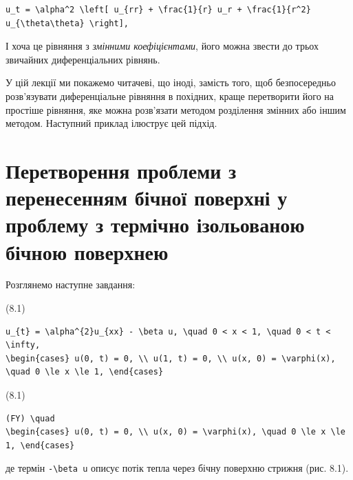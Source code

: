 \documentclass[
  ukrainian,
]{article}
\begin{document}
\begin{verbatim}
u_t = \alpha^2 \left[ u_{rr} + \frac{1}{r} u_r + \frac{1}{r^2} u_{\theta\theta} \right],
\end{verbatim}

І хоча це рівняння з \emph{змінними коефіцієнтами}, його можна звести до
трьох звичайних диференціальних рівнянь.

У цій лекції ми покажемо читачеві, що іноді, замість того, щоб
безпосередньо розв'язувати диференціальне рівняння в похідних, краще
перетворити його на простіше рівняння, яке можна розв'язати методом
розділення змінних або іншим методом. Наступний приклад ілюструє цей
підхід.

\section{Перетворення проблеми з перенесенням бічної поверхні у проблему
з термічно ізольованою бічною
поверхнею}\label{ux43fux435ux440ux435ux442ux432ux43eux440ux435ux43dux43dux44f-ux43fux440ux43eux431ux43bux435ux43cux438-ux437-ux43fux435ux440ux435ux43dux435ux441ux435ux43dux43dux44fux43c-ux431ux456ux447ux43dux43eux457-ux43fux43eux432ux435ux440ux445ux43dux456-ux443-ux43fux440ux43eux431ux43bux435ux43cux443-ux437-ux442ux435ux440ux43cux456ux447ux43dux43e-ux456ux437ux43eux43bux44cux43eux432ux430ux43dux43eux44e-ux431ux456ux447ux43dux43eux44e-ux43fux43eux432ux435ux440ux445ux43dux435ux44e}

Розглянемо наступне завдання:

(8.1)

\begin{verbatim}
u_{t} = \alpha^{2}u_{xx} - \beta u, \quad 0 < x < 1, \quad 0 < t < \infty,
\begin{cases} u(0, t) = 0, \\ u(1, t) = 0, \\ u(x, 0) = \varphi(x), \quad 0 \le x \le 1, \end{cases}
\end{verbatim}

(8.1)

\begin{verbatim}
(FY) \quad
\begin{cases} u(0, t) = 0, \\ u(x, 0) = \varphi(x), \quad 0 \le x \le 1, \end{cases}
\end{verbatim}

де термін \texttt{-\textbackslash{}beta\ u} описує потік тепла через
бічну поверхню стрижня (рис. 8.1).
\end{document}

